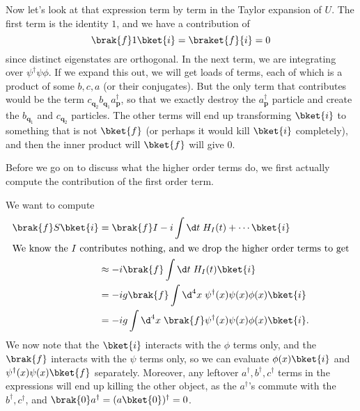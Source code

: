 \documentclass[a4paper]{article}
\begin{document}
Now let's look at that expression term by term in the Taylor expansion of $U$. The first term is the identity $1$, and we have a contribution of
\[
  \brak{f}1\bket{i} = \braket{f}{i} = 0
\]
since distinct eigenstates are orthogonal. In the next term, we are integrating over $\psi^\dagger \psi \phi$. If we expand this out, we will get loads of terms, each of which is a product of some $b, c, a$ (or their conjugates). But the only term that contributes would be the term $c_{\mathbf{q}_2}b_{\mathbf{q}_1}a_{\mathbf{p}}^\dagger$, so that we exactly destroy the $a_\mathbf{p}^\dagger$ particle and create the $b_{\mathbf{q}_1}$ and $c_{\mathbf{q}_2}$ particles. The other terms will end up transforming $\bket{i}$ to something that is not $\bket{f}$ (or perhaps it would kill $\bket{i}$ completely), and then the inner product will $\bket{f}$ will give $0$.

Before we go on to discuss what the higher order terms do, we first actually compute the contribution of the first order term.

We want to compute
\begin{align*}
  \brak{f}S\bket{i} &= \brak{f}I - i\int \d t\; H_I(t) + \cdots\bket{i}\\
  \intertext{We know the $I$ contributes nothing, and we drop the higher order terms to get}
  &\approx -i \brak{f} \int \d t\; H_I(t) \bket{i}\\
  &= -ig \brak{f}\int \d^4 x\; \psi^\dagger(x) \psi(x) \phi(x) \bket{i}\\
  &= -ig \int \d^4 x\; \brak{f}\psi^\dagger(x) \psi(x) \phi(x) \bket{i}.
\end{align*}
We now note that the $\bket{i}$ interacts with the $\phi$ terms only, and the $\brak{f}$ interacts with the $\psi$ terms only, so we can evaluate $\phi(x)\bket{i}$ and $\psi^\dagger (x)\psi(x) \bket{f}$ separately. Moreover, any leftover $a^\dagger, b^\dagger, c^\dagger$ terms in the expressions will end up killing the other object, as the $a^\dagger$'s commute with the $b^\dagger, c^\dagger$, and $\brak{0}a^\dagger = (a \bket{0})^\dagger = 0$.
\end{document}

